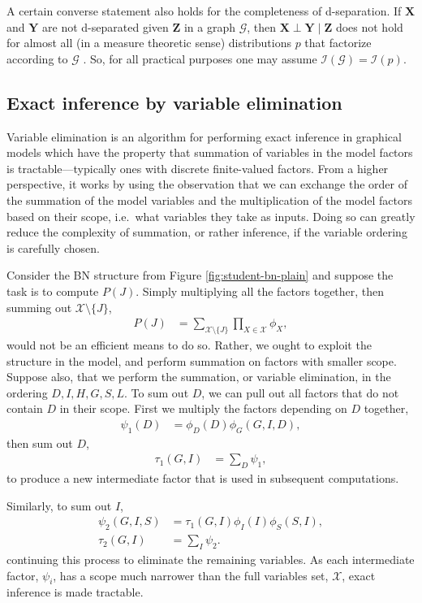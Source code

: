 \documentclass{article}
\begin{document}
A certain converse statement also holds for the completeness of d-separation.
If $\mathbf{X}$ and $\mathbf{Y}$ are not d-separated given $\mathbf{Z}$ in a graph $\mathcal{G}$, then $\mathbf{X}\perp\mathbf{Y}\mid\mathbf{Z}$ does not hold for almost all (in a measure theoretic sense) distributions $p$ that factorize according to $\mathcal{G}$ \citep[Theorem 3.5]{KollerFriedman2009}.
So, for all practical purposes one may assume $\mathcal{I}(\mathcal{G})=\mathcal{I}(p)$.

\subsection{Exact inference by variable elimination}
\label{sec:variable-elimination}
Variable elimination is an algorithm for performing exact inference in graphical models which have the property that summation of variables in the model factors is tractable---typically ones with discrete finite-valued factors.
From a higher perspective, it works by using the observation that we can exchange the order of the summation of the model variables and the multiplication of the model factors based on their scope, i.e.\ what variables they take as inputs.
Doing so can greatly reduce the complexity of summation, or rather inference, if the variable ordering is carefully chosen.

Consider the BN structure from Figure \ref{fig:student-bn-plain} and suppose the task is to compute $P(J)$.
Simply multiplying all the factors together, then summing out $\mathcal{X}\setminus\{J\}$,
\begin{align*}
	P(J) &= \sum_{\mathcal{X}\setminus\{J\}}\prod_{X\in\mathcal{X}}\phi_X,
\end{align*}
would not be an efficient means to do so.
Rather, we ought to exploit the structure in the model, and perform summation on factors with smaller scope.
Suppose also, that we perform the summation, or variable elimination, in the ordering $D,I,H,G,S,L$.
To sum out $D$, we can pull out all factors that do not contain $D$ in their scope.
First we multiply the factors depending on $D$ together,
\begin{align*}
	\psi_1(D) &= \phi_D(D)\phi_G(G,I,D),
\end{align*}
then sum out $D$,
\begin{align*}
	\tau_1(G,I) &= \sum_D\psi_1,
\end{align*}
to produce a new intermediate factor that is used in subsequent computations.

Similarly, to sum out $I$,
\begin{align*}
	\psi_2(G,I,S) &= \tau_1(G,I)\phi_I(I)\phi_S(S,I),\\
	\tau_2(G,I) &= \sum_I\psi_2.
\end{align*}
continuing this process to eliminate the remaining variables.
As each intermediate factor, $\psi_i$, has a scope much narrower than the full variables set, $\mathcal{X}$, exact inference is made tractable.
\end{document}
